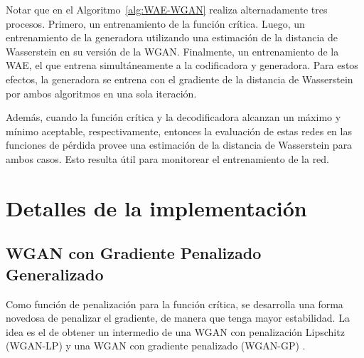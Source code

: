 Notar que en el Algoritmo~\ref{alg:WAE-WGAN} realiza alternadamente tres procesos. Primero, un entrenamiento de la función crítica. Luego, un entrenamiento de la generadora utilizando una estimación de la distancia de Wasserstein en su versión de la WGAN. Finalmente, un entrenamiento de la WAE, el que entrena simultáneamente a la codificadora y generadora. Para estos efectos, la generadora se entrena con el gradiente de la distancia de Wasserstein por ambos algoritmos en una sola iteración.

Además, cuando la función crítica y la decodificadora alcanzan un máximo y mínimo aceptable, respectivamente, entonces la evaluación de estas redes en las funciones de pérdida provee una estimación de la distancia de Wasserstein para ambos casos. Esto resulta útil para monitorear el entrenamiento de la red.

\section{Detalles de la implementación}\label{sec:detalles-implementacion}  %

\subsection{WGAN con Gradiente Penalizado Generalizado}\label{ssec:wgan-ggp}  %

Como función de penalización para la función crítica, se desarrolla una forma novedosa de penalizar el gradiente, de manera que tenga mayor estabilidad. La idea es el de obtener un intermedio de una WGAN con penalización Lipschitz (WGAN-LP) \cite{zhou2018lp} y una WGAN con gradiente penalizado (WGAN-GP) \cite{gulrajani2017improved}.

